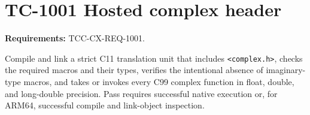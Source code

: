 \documentclass{article}
\begin{document}
\section*{TC-1001 Hosted complex header}
\textbf{Requirements:} TCC-CX-REQ-1001.

Compile and link a strict C11 translation unit that includes
\texttt{<complex.h>}, checks the required macros and their types, verifies the
intentional absence of imaginary-type macros, and takes or invokes every C99
complex function in float, double, and long-double precision. Pass requires
successful native execution or, for ARM64, successful compile and link-object
inspection.
\end{document}

